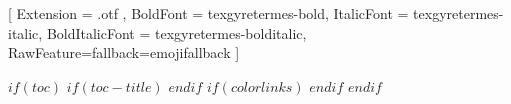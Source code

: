 \usepackage{booktabs,tabu}
\usepackage{xcolor,colortbl}

\usepackage[automark,headsepline,footsepline]{scrlayer-scrpage}
\clearpairofpagestyles
\cfoot[\pagemark]{\pagemark}
\lehead{\headmark}
\rohead{\headmark}
\pagestyle{scrheadings}

\renewcommand*{\chapterformat}{%
\mbox{\chapappifchapterprefix{\nobreakspace}%
\scalebox{3}{\color{gray}\thechapter}\enskip}}

\usepackage{fontspec}

\setmainfont{texgyretermes-regular}[
  Extension      = .otf ,
  BoldFont       = texgyretermes-bold,
  ItalicFont     = texgyretermes-italic,
  BoldItalicFont = texgyretermes-bolditalic,
  RawFeature={fallback=emojifallback}
]


$if(toc)$
$if(toc-title)$
\renewcommand*\contentsname{$toc-title$}
$endif$
$if(colorlinks)$
\hypersetup{linkcolor=$if(toccolor)$$toccolor$$else$$endif$}
$endif$
\setcounter{tocdepth}{$toc-depth$}
$endif$
